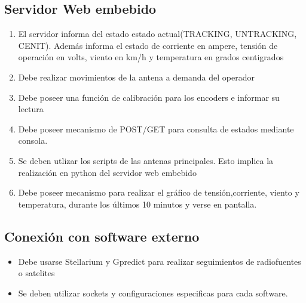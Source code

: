 \documentclass[12pt,a4paper, twosite]{article}
\begin{document}
	\subsection{Servidor Web embebido}
	\begin{enumerate}
		\item El servidor informa del estado estado actual(TRACKING, UNTRACKING, CENIT). Además informa el estado de corriente en ampere, tensión de operación en volts, viento en km/h y temperatura en grados centigrados 
		\item Debe realizar movimientos de la antena a demanda del operador 
		\item Debe poseer una función de calibración para los encoders e informar su lectura 
		\item Debe poseer mecanismo de POST/GET para consulta de estados mediante consola. 
		\item Se deben utlizar los scripts de las antenas principales. Esto implica la realización en python del servidor web embebido
		\item Debe poseer mecanismo para realizar el gráfico de tensión,corriente, viento y temperatura, durante los últimos 10 minutos y verse en pantalla.
	\end{enumerate}

\subsection{Conexión con software externo}
	\begin{itemize}
		\item Debe usarse Stellarium y Gpredict para realizar seguimientos de radiofuentes o satelites
		\item Se deben utilizar sockets y configuraciones especificas para cada software. 
	\end{itemize}
\end{document}
